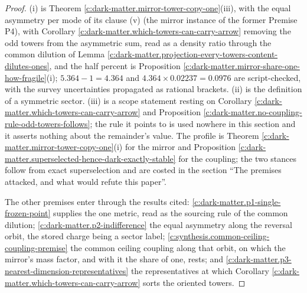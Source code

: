 \documentclass[11pt]{article}
\theoremstyle{definition}
\theoremstyle{plain}
\begin{document}
\begin{proof}
(i) is Theorem \ref{c:dark-matter.mirror-tower-copy-one}(iii), with the equal asymmetry per mode of its clause (v) (the mirror instance of the former Premise P4), with Corollary \ref{c:dark-matter.which-towers-can-carry-arrow} removing the odd towers from the asymmetric sum, read as a density ratio through the common dilution of Lemma \ref{c:dark-matter.projection-every-towers-content-dilutes-ones}, and the half percent is Proposition \ref{c:dark-matter.mirror-share-one-how-fragile}(i); $5.364 - 1 = 4.364$ and $4.364 \times 0.02237 = 0.0976$ are script-checked, with the survey uncertainties propagated as rational brackets. (ii) is the definition of a symmetric sector. (iii) is a scope statement resting on Corollary \ref{c:dark-matter.which-towers-can-carry-arrow} and Proposition \ref{c:dark-matter.no-coupling-rule-odd-towers-follows}; the rule it points to is used nowhere in this section and it asserts nothing about the remainder's value. The profile is Theorem \ref{c:dark-matter.mirror-tower-copy-one}(i) for the mirror and Proposition \ref{c:dark-matter.superselected-hence-dark-exactly-stable} for the coupling; the two stances follow from exact superselection and are costed in the section ``The premises attacked, and what would refute this paper''.

The other premises enter through the results cited: \ref{c:dark-matter.p1-single-frozen-point} supplies the one metric, read as the sourcing rule of the common dilution; \ref{c:dark-matter.p2-indifference} the equal asymmetry along the reversal orbit, the stored charge being a sector label; \ref{c:synthesis.common-ceiling-coupling-premise} the common ceiling coupling along that orbit, on which the mirror's mass factor, and with it the share of one, rests; and \ref{c:dark-matter.p3-nearest-dimension-representatives} the representatives at which Corollary \ref{c:dark-matter.which-towers-can-carry-arrow} sorts the oriented towers.

\end{proof}
\end{document}
